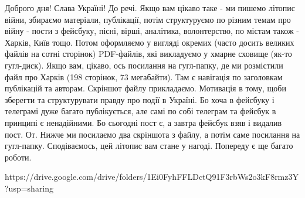 Доброго дня! Слава Україні! До речі. Якщо вам цікаво таке -  ми пишемо літопис
війни, збираємо матеріали, публікації, потім структуруємо по різним темам про
війну - пости з фейсбуку, пісні, вірші, аналітика, волонтерство, по містам
також - Харків, Київ тощо. Потом оформляємо у вигляді окремих (часто досить
великих файлів на сотні сторінок) PDF-файлів, які викладуємо у хмарне сховище
(як-то гугл-диск). Якщо вам, цікаво, ось посилання на гугл-папку, де ми
розмістили файл про Харків (198 сторінок, 73 мегабайти). Там є навігація по
заголовкам публікацій та авторам. Скріншот файлу прикладаємо. Мотивація в тому,
щоби зберегти та структурувати правду про події в Україні. Бо хоча в фейсбуку і
телеграмі дуже багато публікується, але самі по собі телеграм та фейсбук в
принципі є ненадійними. Бо сьогодні пост є, а завтра фейсбук взяв і видалив
пост. От. Нижче ми посилаємо два скріншота з файлу, а потім саме посилання на
гугл-папку. Сподіваємось, цей літопис вам стане у нагоді. Попереду є ще багато
роботи.





https://drive.google.com/drive/folders/1Ei0FyhFFLDctQ91F3rbWs2o3kF8rmz3Y?usp=sharing
